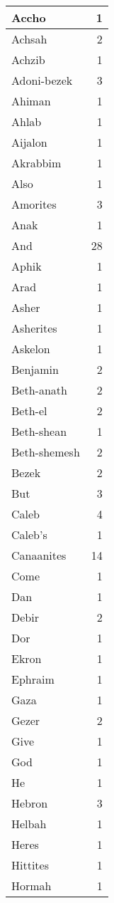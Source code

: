 \begin{center}
\begin{longtable}{l|r}
\hline \hline
\endlastfoot
Accho & 1 \\ \hline
Achsah & 2 \\ \hline
Achzib & 1 \\ \hline
Adoni-bezek & 3 \\ \hline
Ahiman & 1 \\ \hline
Ahlab & 1 \\ \hline
Aijalon & 1 \\ \hline
Akrabbim & 1 \\ \hline
Also & 1 \\ \hline
Amorites & 3 \\ \hline
Anak & 1 \\ \hline
And & 28 \\ \hline
Aphik & 1 \\ \hline
Arad & 1 \\ \hline
Asher & 1 \\ \hline
Asherites & 1 \\ \hline
Askelon & 1 \\ \hline
Benjamin & 2 \\ \hline
Beth-anath & 2 \\ \hline
Beth-el & 2 \\ \hline
Beth-shean & 1 \\ \hline
Beth-shemesh & 2 \\ \hline
Bezek & 2 \\ \hline
But & 3 \\ \hline
Caleb & 4 \\ \hline
Caleb's & 1 \\ \hline
Canaanites & 14 \\ \hline
Come & 1 \\ \hline
Dan & 1 \\ \hline
Debir & 2 \\ \hline
Dor & 1 \\ \hline
Ekron & 1 \\ \hline
Ephraim & 1 \\ \hline
Gaza & 1 \\ \hline
Gezer & 2 \\ \hline
Give & 1 \\ \hline
God & 1 \\ \hline
He & 1 \\ \hline
Hebron & 3 \\ \hline
Helbah & 1 \\ \hline
Heres & 1 \\ \hline
Hittites & 1 \\ \hline
Hormah & 1 \\ \hline

\end{longtable}
\end{center}
